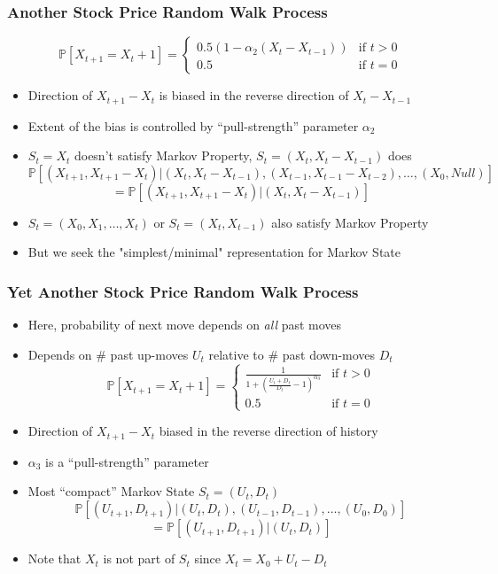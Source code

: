 \documentclass[handout]{beamer}
\begin{document}
\begin{frame}
\frametitle{Another Stock Price Random Walk Process}
\pause
$$
\mathbb{P}[X_{t+1} = X_t + 1] =
\begin{cases}
0.5 (1 - \alpha_2(X_t - X_{t-1})) & \text{if } t > 0\\
0.5 & \text{if } t = 0
\end{cases}
$$
\begin{itemize}[<+->]
\item Direction of $X_{t+1} - X_t$ is biased in the reverse direction of $X_t - X_{t-1}$
\item Extent of the bias is controlled by ``pull-strength'' parameter $\alpha_2$
\item $S_t  = X_t$ doesn't satisfy Markov Property, $S_t = (X_t, X_t - X_{t-1})$ does
$$\mathbb{P}[(X_{t+1}, X_{t+1} - X_t)|(X_t, X_t - X_{t-1}), (X_{t-1}, X_{t-1} - X_{t-2}), \ldots, (X_0, Null)]$$
$$= \mathbb{P}[(X_{t+1}, X_{t+1} - X_t)|(X_t, X_t - X_{t-1})] $$
\item $S_t = (X_0, X_1, \ldots, X_t)$ or $S_t = (X_t, X_{t-1})$ also satisfy Markov Property
\item But we seek the  "simplest/minimal" representation for Markov State
\end{itemize}
\end{frame}

\begin{frame}
\frametitle{Yet Another Stock Price Random Walk Process}
\pause
\begin{itemize}[<+->]
\item Here, probability of next move depends on {\em all} past moves
\item Depends on \# past up-moves $U_t$ relative to \# past down-moves $D_t$
$$
\mathbb{P}[X_{t+1} = X_t + 1] =
\begin{cases}
\frac 1 {1 + (\frac {U_t + D_t} {D_t} - 1)^{\alpha_3}} & \text{if } t > 0\\
0.5 & \text{if } t = 0
\end{cases}
$$
\item Direction of $X_{t+1} - X_t$ biased in the reverse direction of history
\item $\alpha_3$ is a ``pull-strength'' parameter
\item Most ``compact'' Markov State $S_t = (U_t, D_t)$
$$\mathbb{P}[(U_{t+1}, D_{t+1})|(U_t, D_t), (U_{t-1}, D_{t-1}), \ldots, (U_0, D_0)]$$
$$ = \mathbb{P}[(U_{t+1}, D_{t+1})|(U_t, D_t)]$$
\item Note that $X_t$ is not part of $S_t$ since $X_t = X_0 + U_t - D_t$
\end{itemize}
\end{frame}
\end{document}

